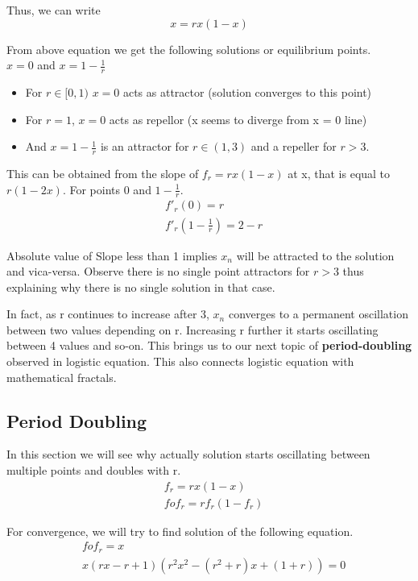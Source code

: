 \documentclass{report}
\begin{document}
Thus, we can write
\begin{equation}
    x = rx(1-x) \nonumber
\end{equation}

From above equation we get the following solutions or equilibrium points.\\

$x = 0$ and $x = 1 - \frac{1}{r}$
\begin{itemize}
  \item For $r \in [0,1)$ $x = 0$ acts as attractor (solution converges to this point)
  \item For $r = 1$, $x = 0$ acts as repellor (x seems to diverge from x = 0 line)
  \item And $x = 1 - \frac{1}{r}$ is an attractor for $r \in (1,3)$ and a repeller for $r > 3$.
\end{itemize}


This can be obtained from the slope of $f_r = rx(1-x)$ at x, \newline
that is equal to $r(1-2x)$. For points 0 and $1-\frac{1}{r}$.
\begin{align}
    &f'_r(0) = r  \nonumber \\
    &f'_r(1-\frac{1}{r}) = 2-r \nonumber
\end{align}

Absolute value of Slope less than 1 implies $x_n$ will be attracted to the solution and vica-versa. Observe there is no single point attractors for $r>3$ thus explaining why there is no single solution in that case.

In fact, as r continues to increase after 3, $x_n$ converges to a permanent oscillation between two values depending on r. Increasing r further it starts oscillating between 4 values and so-on. This brings us to our next topic of \textbf{period-doubling} observed in logistic equation. This also connects logistic equation with mathematical fractals.
\newpage
\subsection{Period Doubling}
\raggedright
In this section we will see why actually solution starts oscillating between multiple points and doubles with r.
\begin{align}
    &f_r = rx(1-x) \nonumber  \\
    &fof_r = rf_r(1-f_r) \nonumber
\end{align}

For convergence, we will try to find solution of the following equation.
\begin{align}
   & fof_r = x  \nonumber\\
   & x(rx-r+1)(r^2x^2 - (r^2+r)x+(1+r)) = 0 \nonumber
\end{align}
\end{document}
